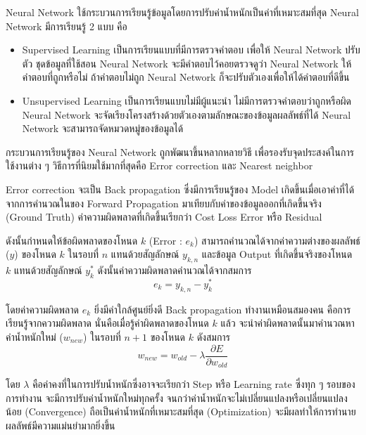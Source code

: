 \documentclass[12pt,oneside,openright,a4paper]{cpe-thai-project}
\begin{document}
    Neural Network ใช้กระบวนการเรียนรู้ข้อมูลโดยการปรับค่าน้ำหนักเป็นค่าที่เหมาะสมที่สุด 
    Neural Network มีการเรียนรู้ 2 แบบ คือ
    \begin{itemize}
      \item Supervised Learning เป็นการเรียนแบบที่มีการตรวจคำตอบ เพื่อให้ Neural Network ปรับตัว ชุดข้อมูลที่ใช้สอน Neural Network จะมีคำตอบไว้คอยตรวจดูว่า 
      Neural Network ให้คำตอบที่ถูกหรือไม่ ถ้าคำตอบไม่ถูก Neural Network ก็จะปรับตัวเองเพื่อให้ได้คำตอบที่ดีขึ้น 
      \item Unsupervised Learning เป็นการเรียนแบบไม่มีผู้แนะนำ ไม่มีการตรวจคำตอบว่าถูกหรือผิด Neural Network 
      จะจัดเรียงโครงสร้างด้วยตัวเองตามลักษณะของข้อมูลผลลัพธ์ที่ได้ Neural Network จะสามารถจัดหมวดหมู่ของข้อมูลได้
    \end{itemize}
    \hspace{1cm}กระบวนการเรียนรู้ของ Neural Network ถูกพัฒนาขึ้นหลากหลายวิธี เพื่อรองรับจุดประสงค์ในการใช้งานต่าง ๆ 
    วิธีการที่นิยมใช้มากที่สุดคือ Error correction และ Nearest neighbor

    \hspace{1cm}Error correction จะเป็น Back propagation ซึ่งมีการเรียนรู้ของ Model เกิดขึ้นเมื่อเอาค่าที่ได้จากการคำนวณในของ Forward Propagation 
    มาเทียบกับค่าของข้อมูลออกที่เกิดขึ้นจริง (Ground Truth) ค่าความผิดพลาดที่เกิดขึ้นเรียกว่า Cost Loss Error หรือ Residual

    \hspace{1cm}ดังนั้นกำหนดให้ข้อผิดพลาดของโหนด \(k\) (Error : \(e_k\)) สามารถคำนวณได้จากค่าความต่างของผลลัพธ์ (\(y\)) ของโหนด \(k\) 
    ในรอบที่ \(n\) แทนด้วยสัญลักษณ์ \(y_{k,n}\) และข้อมูล Output ที่เกิดขึ้นจริงของโหนด \(k\) แทนด้วยสัญลักษณ์ \(y^*_k\) ดังนั้นค่าความผิดพลาดคำนวณได้จากสมการ
    \[ e_k = y_{k,n} - y^*_k \] 

    \hspace{1cm}โดยค่าความผิดพลาด \(e_k\) ยิ่งมีค่าใกล้ศูนย์ยิ่งดี Back propagation ทำงานเหมือนสมองคน คือการเรียนรู้จากความผิดพลาด นั่นคือเมื่อรู้ค่าผิดพลาดของโหนด \(k\) แล้ว 
    จะนำค่าผิดพลาดนั้นมาคำนวณหาค่าน้ำหนักใหม่ (\(w_{new}\)) ในรอบที่ \(n+1\) ของโหนด \(k\) ดังสมการ
    \[ w_{new} = w_{old} - \lambda \frac{\partial E}{\partial w_{old}} \] 

    \hspace{1cm}โดย \(\lambda\) คือค่าคงที่ในการปรับน้ำหนักซึ่งอาจจะเรียกว่า Step หรือ Learning rate ซึ่งทุก ๆ รอบของการทำงาน จะมีการปรับค่าน้ำหนักใหม่ทุกครั้ง
    จนกว่าค่าน้ำหนักจะไม่เปลี่ยนแปลงหรือเปลี่ยนแปลงน้อย (Convergence) ถือเป็นค่าน้ำหนักที่เหมาะสมที่สุด (Optimization) จะมีผลทำให้การทำนายผลลัพธ์มีความแม่นยำมากยิ่งขึ้น
\end{document}

